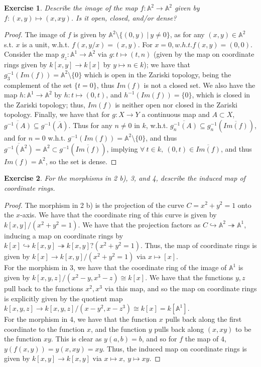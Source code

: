 \documentclass{article}
\newcommand{\bb}[1]{\mathbb{#1}}
\newcommand{\iso}{\cong}
\newtheorem{exercise}{Exercise}
\begin{document}
\begin{exercise}
  Describe the image of the map $f: \bb{A}^{2} \to \bb{A}^{2}$ given by $f: (x,y) \mapsto (x, xy)$. Is it open, closed, and/or dense?
\end{exercise}
\begin{proof}
  The image of $f$ is given by $\bb{A}^{2} \setminus \{(0,y) \ | \ y \neq 0\}$, as for any $(x,y) \in \bb{A}^{2}$ s.t. $x$ is a unit, w.h.t. $f(x,y/x) = (x,y)$. For $x = 0, w.h.t. f(x,y) = (0,0)$. Consider the map $g_{z}: \bb{A}^{1} \to \bb{A}^{2}$ via $g: t \mapsto (t,n)$ (given by the map on coordinate rings given by $k[x,y] \to k[x]$ by $y \mapsto n \in k$); we have that $g_{3}^{-1}(Im(f)) = \bb{A}^{2} \setminus \{0\}$ which is open in the Zariski topology, being the complement of the set $\{t = 0\}$, thus  $Im(f)$ is not a closed set. We also have the map $h:\bb{A}^{1} \to \bb{A}^{2}$ by $h: t \mapsto (0,t)$, and $h^{-1}(Im(f)) = \{0\}$, which is closed in the Zariski topology; thus, $Im(f)$ is neither open nor closed in the Zariski topology. Finally, we have that for $g: X \to Y$ a continuous map and $A \subset X$, $\overline{g^{-1}(A)} \subseteq g^{-1}(\overline{A})$. Thus for any $n \neq 0$ in $k$, w.h.t. $\overline{g_{n}^{-1}(A)} \subseteq g_{n}^{-1}(\overline{Im(f)})$, and for $n = 0$ w.h.t. $g^{-1}(Im(f)) = \bb{A}^{2} \setminus \{0\}$, and thus $\overline{g^{-1}(\bb{A}^{2})} = \bb{A}^{2} \subset g^{-1}(\overline{Im(f)})$, implying $\forall \ t \in k, \ (0,t) \in \overline{Im(f)}$, and thus $Im(f) = \bb{A}^{2}$, so the set is dense. 
\end{proof}
\newpage
\begin{exercise}
  For the morphisms in 2 b), 3, and 4, describe the induced map of coordinate rings.
\end{exercise}
\begin{proof}
  The morphism in 2 b) is the projection of the curve $C = x^{2}+y^{2}=1$ onto the $x$-axis. We have that the coordinate ring of this curve is given by $k[x,y]/(x^{2}+y^{2}=1)$. We have that the projection factors as $C \hookrightarrow \bb{A}^{2} \twoheadrightarrow \bb{A}^{1}$, inducing a map on coordinate rings by $k[x] \hookrightarrow k[x,y] \twoheadrightarrow k[x,y]?(x^{2}+y^{2} = 1)$. Thus, the map of coordinate rings is given by $k[x] \to k[x,y]/(x^{2}+y^{2} = 1)$ via $x \mapsto [x]$. \\

  For the morphism in 3, we have that the coordinate ring of the image of $\bb{A}^{1}$ is given by $k[x,y,z]/(x^{2}-y, x^{3}-z) \iso k[x]$. We have that the functions $y,z$ pull back to the functions $x^{2}, x^{3}$ via this map, and so the map on coordinate rings is explicitly given by the quotient map $k[x,y,z] \to k[x,y,z]/(x - y^{2}, x - z^{3}) \iso k[x] = k[\bb{A}^{1}]$.\\

  For the morphism in 4, we have that the function $x$ pulls back along the first coordinate to the function $x$, and the function $y$ pulls back along $(x,xy)$ to be the function $xy$. This is clear as $y(a,b) = b$, and so for $f$ the map of $4$, $y(f(x,y)) = y(x,xy) = xy$. Thus, the induced map on coordinate rings is given by $k[x,y] \to k[x,y]$ via $x \mapsto x, \ y\mapsto xy$.
\end{proof}
\end{document}

